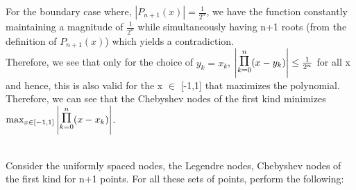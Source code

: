 \documentclass[letterpaper]{exam}
\begin{document}
\begin{questions}
\begin{parts}
\begin{solution}
For the boundary case where, $\left|P_{n+1}(x)\right| = \frac{1}{2^n}$, we have the function constantly maintaining a magnitude of $\frac{1}{2^n}$ while simultaneously having n+1 roots (from the definition of $P_{n+1}(x)$) which yields a contradiction.
\\
Therefore, we see that only for the choice of $y_{k} = x_{k}$,
$\left|\overset{n}{\underset{k=0}{\mathlarger{\mathlarger{\mathlarger{\Pi}}}}} (x-y_{k})\right| \leq \frac{1}{2^n}$ for all x and hence, this is also valid for the x $\in$ [-1,1] that maximizes the polynomial.\\
Therefore, we can see that the Chebyshev nodes of the first kind minimizes $\text{max}_{x\in [-1,1]} \left|\overset{n}{\underset{k=0}{\mathlarger{\mathlarger{\mathlarger{\Pi}}}}} (x-x_{k})\right|$. 
\end{solution}
\end{parts}
\\
Consider the uniformly spaced nodes, the Legendre nodes, Chebyshev nodes of the first kind for n+1 points. For all these sets of points, perform the following:
\begin{parts}

\end{parts}
\end{questions}
\end{document}
